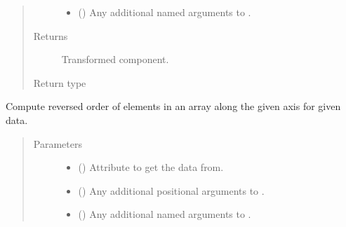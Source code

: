 \documentclass[letterpaper,10pt,english]{sphinxmanual}
\begin{document}
\begin{fulllineitems}
\begin{fulllineitems}
\begin{quote}
\begin{description}
\begin{itemize}
\item {} 
 () \textendash{} Any additional named arguments to .

\end{itemize}

\item[{Returns}] \leavevmode
{} \textendash{} Transformed component.

\item[{Return type}] \leavevmode
{\hyperref[\detokenize{api/base_classes:geology.src.base_spatial.SpatialComponent}]{}}

\end{description}\end{quote}

\end{fulllineitems}


\begin{fulllineitems}
\label{\detokenize{api/states:geology.src.States.flip}}
Compute reversed order of elements in an array along the given axis for given data.
\begin{quote}\begin{description}
\item[{Parameters}] \leavevmode\begin{itemize}
\item {} 
 (\sphinxstyleliteralemphasis{\sphinxupquote{, }}) \textendash{} Attribute to get the data from.

\item {} 
 () \textendash{} Any additional positional arguments to .

\item {} 
 () \textendash{} Any additional named arguments to .


\end{itemize}
\end{description}
\end{quote}
\end{fulllineitems}
\end{fulllineitems}
\end{document}
